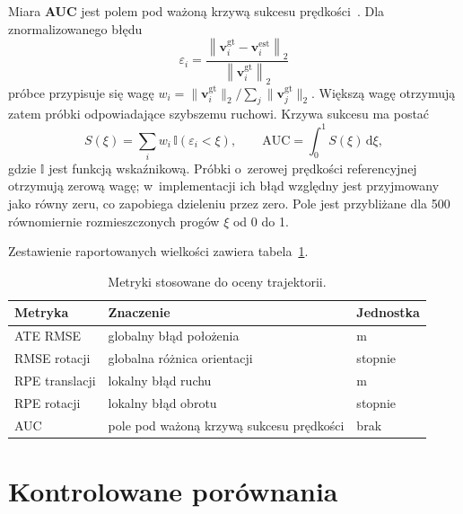 Miara \textbf{AUC} jest polem pod ważoną krzywą sukcesu prędkości~\cite{evslam2026evaluation}. Dla znormalizowanego błędu
\begin{equation}
    \varepsilon_i=\frac{\left\|\mathbf{v}_i^{\mathrm{gt}}-\mathbf{v}_i^{\mathrm{est}}\right\|_2}{\left\|\mathbf{v}_i^{\mathrm{gt}}\right\|_2}
    \label{eq:methodology_velocity_error}
\end{equation}
próbce przypisuje się wagę $w_i=\|\mathbf{v}_i^{\mathrm{gt}}\|_2/\sum_j\|\mathbf{v}_j^{\mathrm{gt}}\|_2$. Większą wagę otrzymują zatem próbki odpowiadające szybszemu ruchowi. Krzywa sukcesu ma postać
\begin{equation}
    S(\xi)=\sum_i w_i\,\mathbb{I}(\varepsilon_i<\xi),
    \qquad
    \mathrm{AUC}=\int_0^1 S(\xi)\,\mathrm{d}\xi,
    \label{eq:methodology_auc}
\end{equation}
gdzie $\mathbb{I}$ jest funkcją wskaźnikową. Próbki o~zerowej prędkości referencyjnej otrzymują zerową wagę; w~implementacji ich błąd względny jest przyjmowany jako równy zeru, co zapobiega dzieleniu przez zero. Pole jest przybliżane dla 500 równomiernie rozmieszczonych progów $\xi$ od 0 do 1.

Zestawienie raportowanych wielkości zawiera tabela~\ref{tab:metryki_trajektorii}.

\begin{table}[!ht]
    \centering
    \small
    \caption{Metryki stosowane do oceny trajektorii.}
    \label{tab:metryki_trajektorii}
    \begin{tabularx}{\textwidth}{
        >{\raggedright\arraybackslash}p{}
        >{\raggedright\arraybackslash}X
        >{\raggedright\arraybackslash}p{}
    }
        \toprule
        Metryka & Znaczenie & Jednostka \\
        \midrule
        ATE RMSE & globalny błąd położenia & m \\
        RMSE rotacji & globalna różnica orientacji & stopnie \\
        RPE translacji & lokalny błąd ruchu & m \\
        RPE rotacji & lokalny błąd obrotu & stopnie \\
        AUC & pole pod ważoną krzywą sukcesu prędkości & brak \\
        \bottomrule
    \end{tabularx}
\end{table}

\section{Kontrolowane porównania}
\label{sec:badania_wariantow}

